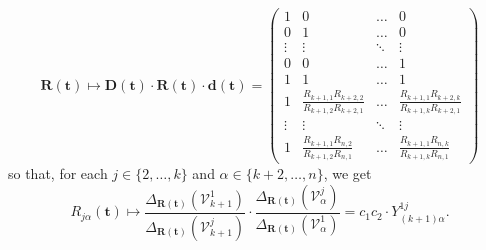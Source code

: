 \documentclass[10pt]{article}
\theoremstyle{remark}%
\theoremstyle{definition}%
\begin{document}
 \begin{equation}
\mathbf{R}(\mathbf{t})\mapsto\mathbf{D}(\mathbf{t})\cdot\mathbf{R}(\mathbf{t})\cdot\mathbf{d}(\mathbf{t})=\left(\begin{array}{cccc}
1 & 0 & \dots & 0\\
0 & 1 & \dots & 0\\
\vdots & \vdots & \ddots & \vdots\\
0 & 0 & \dots & 1\\
1 & 1 & \dots & 1\\
1 & \frac{R_{k+1,1}R_{k+2,2}}{R_{k+1,2}R_{k+2,1}} & \dots & \frac{R_{k+1,1}R_{k+2,k}}{R_{k+1,k}R_{k+2,1}}\\
\vdots & \vdots & \ddots & \vdots\\
1 & \frac{R_{k+1,1}R_{n,2}}{R_{k+1,2}R_{n,1}} & \dots & \frac{R_{k+1,1}R_{n,k}}{R_{k+1,k}R_{n,1}}
\end{array}\right)
\label{eq: action of special gauge on R}
 \end{equation}
so that, for each $j\in\{2,\dots,k\}$ and $\alpha\in\{k+2,\dots,n\}$, we get
 \begin{equation}
R_{j\alpha}(\mathbf{t})\mapsto\frac{\Delta_{\mathbf{R}(\mathbf{t})}(\mathcal{V}_{k+1}^{1})}{\Delta_{\mathbf{R}(\mathbf{t})}(\mathcal{V}_{k+1}^{j})}\cdot\frac{\Delta_{\mathbf{R}(\mathbf{t})}(\mathcal{V}_{\alpha}^{j})}{\Delta_{\mathbf{R}(\mathbf{t})}(\mathcal{V}_{\alpha}^{1})}=c_{1}c_{2}\cdot Y_{(k+1)\alpha}^{1j}.
\label{eq: entries of R in special gauge}
 \end{equation}
\end{document}
